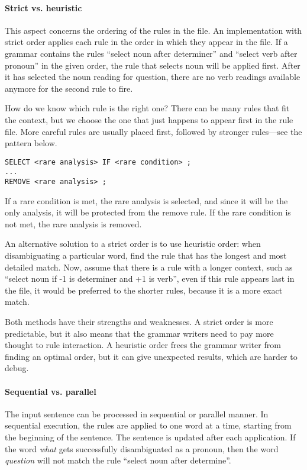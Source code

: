 \paragraph{Strict vs. heuristic}

This aspect concerns the ordering of the rules in the file. An implementation with strict order applies each rule in the order in which they appear in the file. If a grammar contains the rules “select noun after determiner” and “select verb after pronoun” in the given order, the rule that selects noun will be applied first. After it has selected the noun reading for question, there are no verb readings available anymore for the second rule to fire.
					
How do we know which rule is the right one? There can be many rules that fit the context, but we choose the one that just happens to appear first in the rule file. More careful rules are usually placed first, followed by stronger rules—see the pattern below.

\begin{verbatim}					
SELECT <rare analysis> IF <rare condition> ;
...
REMOVE <rare analysis> ;
\end{verbatim}
If a rare condition is met, the rare analysis is selected, and since it will be the only analysis, it will be protected from the remove rule. If the rare condition is not met, the rare analysis is removed.
					
An alternative solution to a strict order is to use heuristic order: when disambiguating a particular word, find the rule that has the longest and most detailed match. Now, assume that there is a rule with a longer context, such as “select noun if -1 is determiner and +1 is verb”, even if this rule appears last in the file, it would be preferred to the shorter rules, because it is a more exact match.
					
Both methods have their strengths and weaknesses. A strict order is more predictable, but it also means that the grammar writers need to pay more thought to rule interaction. A heuristic order frees the grammar writer from finding an optimal order, but it can give unexpected results, which are harder to debug.


\paragraph{Sequential vs. parallel}

The input sentence can be processed in sequential or parallel manner. In sequential execution, the rules are applied to one word at a time, starting from the beginning of the sentence. The sentence is updated after each application. If the word \emph{what} gets successfully disambiguated as a pronoun, then the word \emph{question} will not match the rule ``select noun after determine''.


